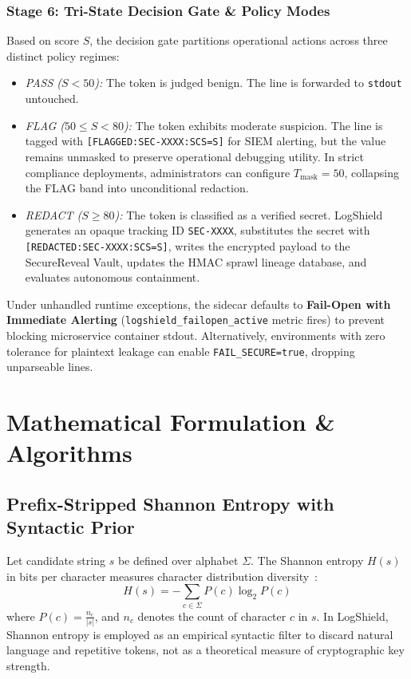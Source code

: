 \documentclass[conference]{IEEEtran}
\begin{document}
\subsubsection{Stage 6: Tri-State Decision Gate \& Policy Modes}
Based on score $S$, the decision gate partitions operational actions across three distinct policy regimes:
\begin{itemize}
    \item \textit{PASS ($S < 50$):} The token is judged benign. The line is forwarded to \texttt{stdout} untouched.
    \item \textit{FLAG ($50 \le S < 80$):} The token exhibits moderate suspicion. The line is tagged with \texttt{[FLAGGED:SEC-XXXX:SCS=S]} for SIEM alerting, but the value remains unmasked to preserve operational debugging utility. In strict compliance deployments, administrators can configure $T_{\text{mask}} = 50$, collapsing the FLAG band into unconditional redaction.
    \item \textit{REDACT ($S \ge 80$):} The token is classified as a verified secret. LogShield generates an opaque tracking ID \texttt{SEC-XXXX}, substitutes the secret with \texttt{[REDACTED:SEC-XXXX:SCS=S]}, writes the encrypted payload to the SecureReveal Vault, updates the HMAC sprawl lineage database, and evaluates autonomous containment.
\end{itemize}
Under unhandled runtime exceptions, the sidecar defaults to \textbf{Fail-Open with Immediate Alerting} (\texttt{logshield\_failopen\_active} metric fires) to prevent blocking microservice container stdout. Alternatively, environments with zero tolerance for plaintext leakage can enable \texttt{FAIL\_SECURE=true}, dropping unparseable lines.


\section{Mathematical Formulation \& Algorithms}

\subsection{Prefix-Stripped Shannon Entropy with Syntactic Prior}
Let candidate string $s$ be defined over alphabet $\Sigma$. The Shannon entropy $H(s)$ in bits per character measures character distribution diversity~\cite{shannon1948mathematical}:
\begin{equation}
    H(s) = - \sum_{c \in \Sigma} P(c) \log_2 P(c)
\end{equation}
where $P(c) = \frac{n_c}{|s|}$, and $n_c$ denotes the count of character $c$ in $s$. In LogShield, Shannon entropy is employed as an empirical syntactic filter to discard natural language and repetitive tokens, not as a theoretical measure of cryptographic key strength.
\end{document}

